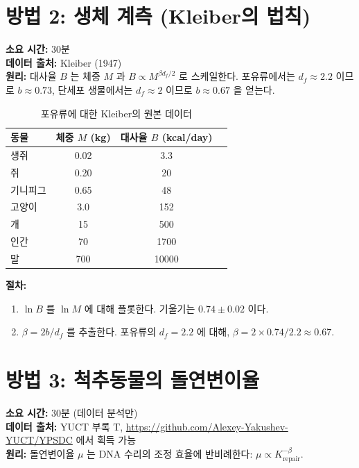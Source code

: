 \documentclass[12pt,a4paper]{article}
\begin{document}
	\section{방법 2: 생체 계측 (Kleiber의 법칙)}
	\label{sec:kleiber}
	
	\textbf{소요 시간:} 30분\\
	\textbf{데이터 출처:} Kleiber (1947) \cite{Kleiber1947}\\
	\textbf{원리:} 대사율 \(B\) 는 체중 \(M\) 과 \(B \propto M^{\beta d_f/2}\) 로 스케일한다. 포유류에서는 \(d_f \approx 2.2\) 이므로 \(b \approx 0.73\), 단세포 생물에서는 \(d_f \approx 2\) 이므로 \(b \approx 0.67\) 을 얻는다.
	
	\begin{table}[H]
		\centering
		\caption{포유류에 대한 Kleiber의 원본 데이터}
		\label{tab:kleiber}
		\begin{tabular}{l c c c}
			\toprule
			동물 & 체중 \(M\) (kg) & 대사율 \(B\) (kcal/day) \\
			\midrule
			생쥐       & 0.02   & 3.3 \\
			쥐         & 0.20   & 20 \\
			기니피그  & 0.65   & 48 \\
			고양이         & 3.0    & 152 \\
			개         & 15     & 500 \\
			인간       & 70     & 1700 \\
			말       & 700    & 10000 \\
			\bottomrule
		\end{tabular}
	\end{table}
	
	\textbf{절차:}
	\begin{enumerate}[label=(\arabic*)]
		\item \(\ln B\) 를 \(\ln M\) 에 대해 플롯한다. 기울기는 \(0.74 \pm 0.02\) 이다.
		\item \(\beta = 2b / d_f\) 를 추출한다. 포유류의 \(d_f = 2.2\) 에 대해,
		\(\beta = 2 \times 0.74 / 2.2 \approx 0.67\).
	\end{enumerate}
	
	\section{방법 3: 척추동물의 돌연변이율}
	\label{sec:mutation}
	
	\textbf{소요 시간:} 30분 (데이터 분석만)\\
	\textbf{데이터 출처:} YUCT 부록 T, \url{https://github.com/Alexey-Yakushev-YUCT/YPSDC} 에서 획득 가능\\
	\textbf{원리:} 돌연변이율 \(\mu\) 는 DNA 수리의 조정 효율에 반비례한다: \(\mu \propto K_{\text{repair}}^{-\beta}\).
	
\end{document}
